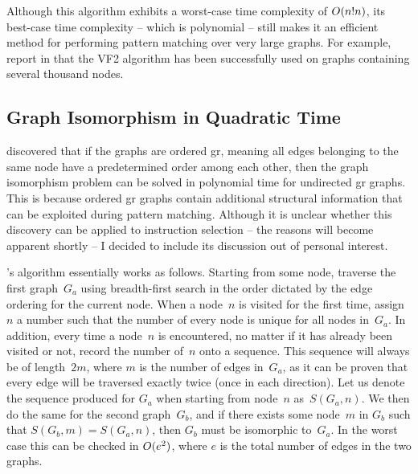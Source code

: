 Although this algorithm exhibits a worst-case time complexity of
\mbox{$O(n!n)$}, its best-case time complexity -- which is
polynomial -- still makes it an efficient method for performing \gls{pattern
  matching} over very large \glspl{graph}.
%
For example,
\citeauthor{Cordella2001} report in \cite{Cordella2001} that the \gls{VF2}
algorithm has been successfully used on \glspl{graph} containing several
thousand \glspl{node}.


\subsection{Graph Isomorphism in Quadratic Time}

 discovered that if the
\glspl{graph} are \gls{ordered gr}, meaning all \glspl{edge} belonging to the
same node have a predetermined order among each other, then the \gls{graph
  isomorphism} problem can be solved in polynomial time for \gls{undirected gr}
\glspl{graph}.
%
This is because \gls{ordered gr} \glspl{graph} contain additional
structural information that can be exploited during \gls{pattern
  matching}.
%
Although it is unclear whether this discovery can be applied to
\gls{instruction selection} -- the reasons will become apparent shortly -- I
decided to include its discussion out of personal interest.

\citeauthor{Jiang1996}'s algorithm essentially works as follows.
%
Starting from
some \gls{node}, traverse the first \gls{graph}~$G_a$ using breadth-first search
in the order dictated by the \gls{edge} ordering for the current
\gls{node}.
%
When a \gls{node}~$n$ is visited for the first time, assign $n$ a
number such that the number of every \gls{node} is unique for all \glspl{node}
in~$G_a$.
%
In addition, every time a \gls{node}~$n$ is encountered, no matter if
it has already been visited or not, record the number of~$n$ onto a
sequence.
%
This sequence will always be of length~$2m$, where $m$ is the number
of \glspl{edge} in~$G_a$, as it can be proven that every \gls{edge} will be
traversed exactly twice (once in each direction).
%
Let us denote the sequence
produced for $G_a$ when starting from \gls{node}~$n$ as~\mbox{$S(G_a, n)$}.
%
We
then do the same for the second \gls{graph}~$G_b$, and if there exists some
\gls{node}~$m$ in $G_b$ such that \mbox{$S(G_b, m) = S(G_a, n)$}, then $G_b$
must be \gls{isomorphic} to~$G_a$.
%
In the worst case this can be checked in
$O(e^2)$, where $e$ is the total number of \glspl{edge} in the two
\glspl{graph}.

